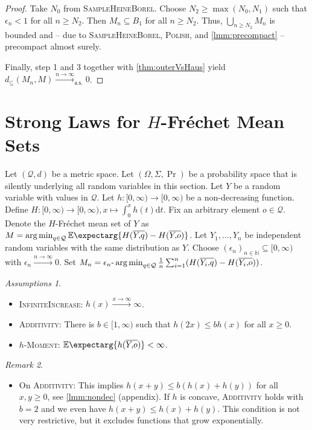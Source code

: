 \documentclass{scrartcl}
\renewcommand{\subset}{\subseteq}
\newcommand{\Ex}{\E\expectarg}
\newcommand*{\mc}[1]{\mathcal{#1}}
\newcommand*{\ms}[1]{\mathsf{#1}}
\newcommand{\N}{\mathbb{N}}
\newcommand{\dl}{\mathrm{d}}
\DeclareMathOperator*{\argmin}{arg\,min}
\theoremstyle{plain}\newtheorem{theorem}{Theorem}[section]
\theoremstyle{definition}
\theoremstyle{remark}
\newtheorem{remark}[theorem]{Remark}
\newtheorem{assumptions}[theorem]{Assumptions}
\begin{document}
\begin{proof}
\noindent
\underline{}
Take $N_0$ from \textsc{SampleHeineBorel}. Choose $N_2\geq \max(N_0, N_1)$ such that $\epsilon_n < 1$ for all $n \geq N_2$. Then $M_n \subset B_1$ for all $n\geq N_2$. Thus, $\bigcup_{n\geq N_2}M_n$ is bounded and -- due to \textsc{SampleHeineBorel}, \textsc{Polish}, and \autoref{lmm:precompact} -- precompact almost surely. 

\noindent
\underline{}
Finally, step 1 and 3 together with \autoref{thm:outerVsHaus} yield $d_\subset(M_n, M) \xrightarrow{n\to\infty}_{\ms{a.s.}} 0$.
\end{proof}
 \section{Strong Laws for $H$-Fréchet Mean Sets}\label{sec:nondec}
Let $(\mc Q, d)$ be a metric space. Let $(\Omega, \Sigma, \Pr)$ be a probability space that is silently underlying all random variables in this section. Let $Y$ be a random variable with values in $\mc Q$.
Let $h \colon [0,\infty) \to [0,\infty)$ be a non-decreasing function.
Define $H \colon [0,\infty) \to [0,\infty), x\mapsto \int_0^x h(t) \dl t$.
Fix an arbitrary element $o\in\mc Q$. Denote the $H$-Fréchet mean set of $Y$ as $M = \argmin_{q\in\mc Q} \Ex{H(\ol Yq) - H(\ol Yo)}$.
Let $Y_1, \dots, Y_n$ be independent random variables with the same distribution as $Y$.
Choose $(\epsilon_n)_{n\in\N}\subset [0,\infty)$ with $\epsilon_n \xrightarrow{n\to\infty}0$. Set $M_n = \epsilon_n\text{-}\argmin_{q\in\mc Q} \frac{1}n \sum_{i=1}^n (H(\ol {Y_i}q) - H(\ol {Y_i}o))$.
\begin{assumptions}\mbox{ }
	\begin{itemize}
	\item \textsc{InfiniteIncrease}:
		$h(x) \xrightarrow{x\to\infty} \infty$.
	\item \textsc{Additivity}:
		There is $b \in [1,\infty)$ such that $h(2x) \leq b h(x)$ for all $x \geq 0$.
	\item \textsc{$h$-Moment}: 
		$\Ex{h(\ol Yo)} < \infty$.
	\end{itemize}
\end{assumptions}
\begin{remark}\mbox{ }
\begin{itemize}
\item On \textsc{Additivity}:
	This implies $h(x+y)\leq b(h(x) + h(y))$ for all $x,y\geq 0$, see \autoref{lmm:nondec} (appendix).
	If $h$ is concave, \textsc{Additivity} holds with $b=2$ and we even have $h(x+y)\leq h(x) + h(y)$.
	This condition is not very restrictive, but it excludes functions that grow exponentially.
\end{itemize}
\end{remark}
\end{document}
